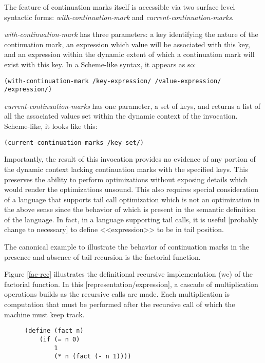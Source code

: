 \documentclass[ms]{byuprop}
\begin{document}
The feature of continuation marks itself is accessible via two surface level syntactic forms: \emph{with-continuation-mark} and \emph{current-continuation-marks}.

\emph{with-continuation-mark} has three parameters: a key identifying the nature of the continuation mark, an expression which value will be associated with this key, and an expression within the dynamic extent of which a continuation mark will exist with this key. In a Scheme-like syntax, it appears as so:

\begin{verbatim}
(with-continuation-mark /key-expression/ /value-expression/ /expression/)
\end{verbatim}

\emph{current-continuation-marks} has one parameter, a set of keys, and returns a list of all the associated values set within the dynamic context of the invocation. Scheme-like, it looks like this:

\begin{verbatim}
(current-continuation-marks /key-set/)
\end{verbatim}

Importantly, the result of this invocation provides no evidence of any portion of the dynamic context lacking continuation marks with the specified keys. This preserves the ability to perform optimizations without exposing details which would render the optimizations unsound. This also requires special consideration of a language that supports tail call optimization which is not an optimization in the above sense since the behavior of which is present in the semantic definition of the language. In fact, in a language supporting tail calls, it is useful [probably change to necessary] to define <<expression>> to be in tail position.

The canonical example to illustrate the behavior of continuation marks in the presence and absence of tail recursion is the factorial function.

Figure \ref{fac-rec} illustrates the definitional recursive implementation (wc) of the factorial function. In this [representation/expression], a cascade of multiplication operations builds as the recursive calls are made. Each multiplication is computation that must be performed after the recursive call of which the machine must keep track.


\begin{figure}
\begin{verbatim}
(define (fact n)
    (if (= n 0)
        1
        (* n (fact (- n 1))))
\end{verbatim}
\end{figure}
\end{document}
